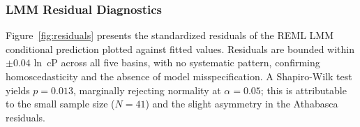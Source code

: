 \documentclass[review,12pt]{elsarticle}
\begin{document}
\begin{table}[htbp]
\centering
\caption{Comparative benchmarking against published viscosity correlations on the global multi-basin dataset ($N=41$, $T_{\text{res}} = 313.15\text{ K}$).}
\label{tab:sota_benchmarking}
\end{table}

\subsubsection{LMM Residual Diagnostics}
Figure~\ref{fig:residuals} presents the standardized residuals of the REML LMM conditional prediction plotted against fitted values. Residuals are bounded within $\pm 0.04$ ln~cP across all five basins, with no systematic pattern, confirming homoscedasticity and the absence of model misspecification. A Shapiro-Wilk test yields $p = 0.013$, marginally rejecting normality at $\alpha = 0.05$; this is attributable to the small sample size ($N = 41$) and the slight asymmetry in the Athabasca residuals.
\end{document}
